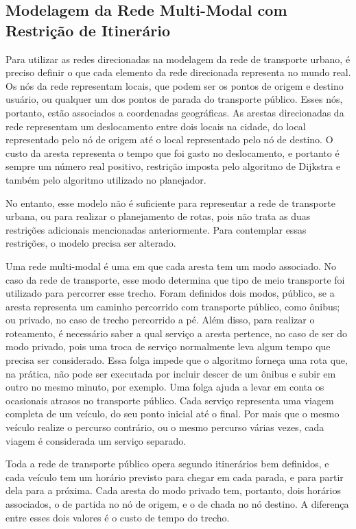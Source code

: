 \subsection{Modelagem da Rede Multi-Modal com Restrição de Itinerário}

Para utilizar as redes direcionadas na modelagem da rede de transporte urbano, é preciso definir o que cada elemento da rede direcionada representa no mundo real. Os nós da rede representam locais, que podem ser os pontos de origem e destino usuário, ou qualquer um dos pontos de parada do transporte público. Esses nós, portanto, estão associados a coordenadas geográficas.
As arestas direcionadas da rede representam um deslocamento entre dois locais na cidade, do local representado pelo nó de origem até o local representado pelo nó de destino. O custo da aresta representa o tempo que foi gasto no deslocamento, e portanto é sempre um número real positivo, restrição imposta pelo algoritmo de Dijkstra e também pelo algoritmo utilizado no planejador.

No entanto, esse modelo não é suficiente para representar a rede de transporte urbana, ou para realizar o planejamento de rotas, pois não trata as duas restrições adicionais mencionadas anteriormente.
Para contemplar essas restrições, o modelo precisa ser alterado.

Uma rede multi-modal é uma em que cada aresta tem um modo associado. 
No caso da rede de transporte, esse modo determina que tipo de meio transporte foi utilizado para percorrer esse trecho.
Foram definidos dois modos, público, se a aresta representa um caminho percorrido com transporte público, como ônibus; ou privado, no caso de trecho percorrido a pé.
Além disso, para realizar o roteamento, é necessário saber a qual serviço a aresta pertence, no caso de ser do modo privado, pois uma troca de serviço normalmente leva algum tempo que precisa ser considerado. Essa folga impede que o algoritmo forneça uma rota que, na prática, não pode ser executada por incluir descer de um ônibus e subir em outro no mesmo minuto, por exemplo. Uma folga ajuda a levar em conta os ocasionais atrasos no transporte público.
Cada serviço representa uma viagem completa de um veículo, do seu ponto inicial até o final. Por mais que o mesmo veículo realize o percurso contrário, ou o mesmo percurso várias vezes, cada viagem é considerada um serviço separado.

Toda a rede de transporte público opera segundo itinerários bem definidos, e cada veículo tem um horário previsto para chegar em cada parada, e para partir dela para a próxima.
Cada aresta do modo privado tem, portanto, dois horários associados, o de partida no nó de origem, e o de chada no nó destino.
A diferença entre esses dois valores é o custo de tempo do trecho.

